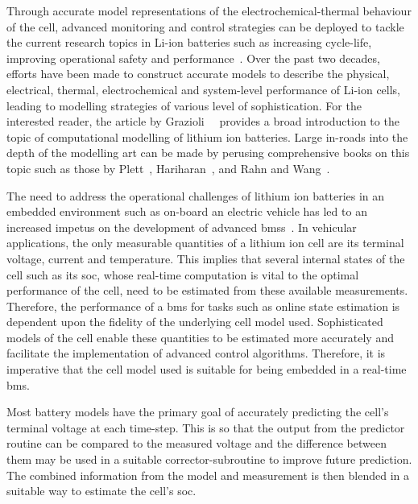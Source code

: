 Through accurate model representations  of the electrochemical-thermal behaviour
of  the cell,  advanced monitoring  and control  strategies can  be deployed  to
tackle  the current  research  topics  in Li-ion  batteries  such as  increasing
cycle-life,  improving  operational   safety  and  performance~\cite{Plett2015}.
Over  the  past two  decades,  efforts  have  been  made to  construct  accurate
models  to  describe  the  physical, electrical,  thermal,  electrochemical  and
system-level performance  of Li-ion  cells, leading  to modelling  strategies of
various  level of  sophistication. For  the  interested reader,  the article  by
Grazioli~\etal~\cite{Grazioli2016a} provides  a broad introduction to  the topic
of computational  modelling of  lithium ion batteries.  Large in-roads  into the
depth of the modelling  art can be made by perusing  comprehensive books on this
topic such  as those by  Plett~\cite{Plett2015}, Hariharan~\cite{Hariharan2017},
and Rahn and Wang~\cite{Rahn2013}.

The  need  to  address  the  operational challenges  of  lithium  ion  batteries
in   an   embedded   environment   such  as   on-board   an   electric   vehicle
has   led   to  an   increased   impetus   on   the  development   of   advanced
\glspl{bms}~\cite{Bergveld2002}. In vehicular  applications, the only measurable
quantities  of  a  lithium  ion  cell are  its  terminal  voltage,  current  and
temperature. This implies  that several internal states of the  cell such as its
\gls{soc}, whose  real-time computation is  vital to the optimal  performance of
the cell, need to be estimated from these available measurements. Therefore, the
performance  of  a \gls{bms}  for  tasks  such  as  online state  estimation  is
dependent upon  the fidelity  of the underlying  cell model  used. Sophisticated
models of the  cell enable these quantities to be  estimated more accurately and
facilitate the implementation  of advanced control algorithms.  Therefore, it is
imperative  that  the cell  model  used  is suitable  for  being  embedded in  a
real-time \gls{bms}.

Most battery  models have the primary  goal of accurately predicting  the cell's
terminal  voltage  at each  time-step.  This  is so  that  the  output from  the
predictor routine  can be compared  to the  measured voltage and  the difference
between them  may be used in  a suitable corrector-subroutine to  improve future
prediction.  The combined  information from  the model  and measurement  is then
blended in a suitable way to estimate the cell's \gls{soc}.

